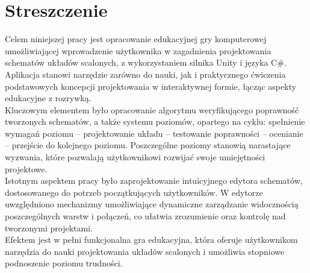 \section*{Streszczenie}
\thispagestyle{plain}
Celem niniejszej pracy jest opracowanie edukacyjnej gry komputerowej umożliwiającej wprowadzenie użytkownika
w zagadnienia projektowania \linebreak
schematów układów scalonych,
z wykorzystaniem silnika Unity i języka C\#.
Aplikacja stanowi narzędzie zarówno do nauki,
jak i praktycznego ćwiczenia podstawowych koncepcji projektowania w interaktywnej formie,
łącząc aspekty edukacyjne z rozrywką.\\
\indent %
Kluczowym elementem było opracowanie algorytmu weryfikującego \linebreak
poprawność tworzonych schematów,
a także systemu poziomów,
opartego na cyklu: spełnienie wymagań poziomu – projektowanie układu – testowanie poprawności – ocenianie – przejście
do kolejnego poziomu.
Poszczególne poziomy stanowią narastające wyzwania,
które pozwalają użytkownikowi rozwijać swoje umiejętności projektowe.\\
\indent Istotnym aspektem pracy było zaprojektowanie intuicyjnego edytora sche\-matów,
dostosowanego do potrzeb początkujących użytkowników.
W edytorze uwzględniono mechanizmy umożliwiające dynamiczne zarządzanie widocznością poszczególnych warstw i połączeń,
co ułatwia zrozumienie oraz kontrolę nad tworzonymi projektami.\\
\indent Efektem jest w pełni funkcjonalna gra edukacyjna,
która oferuje użytkownikom narzędzia do nauki projektowania układów scalonych
i umożliwia stopniowe podnoszenie poziomu trudności.
